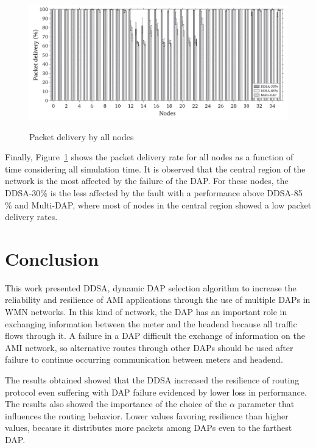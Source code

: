 \documentclass[conference]{IEEEtran}
\begin{document}
\begin{figure}[ht]
  \centering
  \label{intv-dap}{\includegraphics[scale=.21]{IEEE-consolidados/G-no-pdf-app.jpg}} 
  \caption{Packet delivery by all nodes}
  \label{pdf-node}
\end{figure}



Finally, Figure~\ref{pdf-node} shows the packet delivery rate for all nodes as a function of time considering all simulation time. It is observed that the central region of the network is the most affected by the failure of the DAP. For these nodes, the DDSA-30\% is the less affected by the fault with a performance above DDSA-85 \% and Multi-DAP, where most of nodes in the central region showed a low packet delivery rates.

   
   
\section{Conclusion}

This work presented DDSA, dynamic DAP selection algorithm to increase the reliability and resilience of AMI applications through the use of multiple DAPs in WMN networks. In this kind of network, the DAP has an important role in exchanging information between the meter and the headend because all traffic flows through it. A failure in a DAP difficult the exchange of information on the AMI network, so alternative routes through other DAPs should be used after failure to continue occurring communication between meters and headend.

The results obtained showed that the DDSA increased the resilience of routing protocol even suffering with DAP failure evidenced by lower loss in performance. The results also showed the importance of the choice of the $\alpha$ parameter that influences the routing behavior. Lower values favoring resilience than higher values, because it distributes more packets among DAPs even to the farthest DAP.
\end{document}
